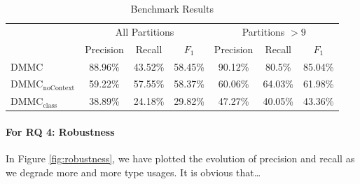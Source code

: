 \begin{table}[ht]
    \centering
    \begin{tabular}[h]{l|c|c|c|c|c|c}
\toprule
 & \multicolumn{3}{c|}{All Partitions}      & \multicolumn{3}{c}{Partitions $> 9$} \\
                                 & Precision & Recall  & $F_1$   & Precision & Recall  & $F_1$ \\
\midrule
$\text{DMMC}$                    & 88.96\%   & 43.52\% & 58.45\% & 90.12\%   & 80.5\%  & 85.04\% \\
$\text{DMMC}_\text{noContext}$   & 59.22\%   & 57.55\% & 58.37\% & 60.06\%   & 64.03\% & 61.98\% \\
$\text{DMMC}_\text{class}$       & 38.89\%   & 24.18\% & 29.82\% & 47.27\%   & 40.05\% & 43.36\% \\
\bottomrule
    \end{tabular}
    \caption{Benchmark Results}\label{fig:bench}
\end{table}

\paragraph{For RQ 4: Robustness}

In Figure \ref{fig:robustness}, we have plotted the evolution of precision and recall as we degrade more and more type usages.
It is obvious that\ldots
{}

